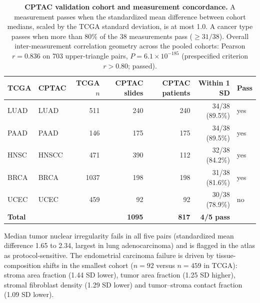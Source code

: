 \documentclass[11pt]{article}
\begin{document}
\begin{table}[htbp]
\centering
\caption{\textbf{CPTAC validation cohort and measurement concordance.} A
measurement passes when the standardized mean difference between cohort medians,
scaled by the TCGA standard deviation, is at most 1.0. A cancer type passes when
more than 80\% of the 38 measurements pass ($\geq 31/38$). Overall
inter-measurement correlation geometry across the pooled cohorts:
Pearson $r = 0.836$ on 703 upper-triangle pairs,
$P = 6.1 \times 10^{-185}$ (prespecified criterion $r > 0.80$; passed).}
\label{tab:s9}
\small
\begin{tabular}{llrrrrl}
\toprule
TCGA & CPTAC & TCGA $n$ & CPTAC slides & CPTAC patients & Within 1 SD & Pass \\
\midrule
LUAD & LUAD  & 511  & 240 & 240 & 34/38 (89.5\%) & yes \\
PAAD & PAAD  & 146  & 175 & 175 & 34/38 (89.5\%) & yes \\
HNSC & HNSCC & 471  & 390 & 112 & 32/38 (84.2\%) & yes \\
BRCA & BRCA  & \num{1037} & 198 & 198 & 31/38 (81.6\%) & yes \\
UCEC & UCEC  & 459  & 92  & 92  & 30/38 (78.9\%) & no \\
\midrule
\multicolumn{2}{l}{\textbf{Total}} & & \textbf{\num{1095}} & \textbf{817} & \textbf{4/5 pass} & \\
\bottomrule
\end{tabular}
\par\vspace{0.4em}
\parbox{0.94\textwidth}{\footnotesize Median tumor nuclear irregularity fails in
all five pairs (standardized mean difference 1.65 to 2.34, largest in lung
adenocarcinoma) and is flagged in the atlas as protocol-sensitive. The
endometrial carcinoma failure is driven by tissue-composition shifts in the
smallest cohort ($n = 92$ versus $n = 459$ in TCGA): stroma area fraction
(1.44 SD lower), tumor area fraction (1.25 SD higher), stromal fibroblast
density (1.29 SD lower) and tumor--stroma contact fraction (1.09 SD lower).}
\end{table}
\end{document}
